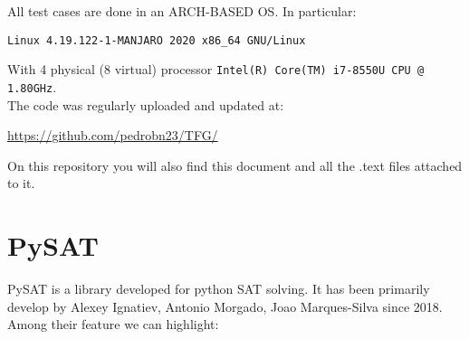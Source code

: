 All test cases are done in an ARCH-BASED OS. In particular:

  {\begin{center}
      \texttt{Linux 4.19.122-1-MANJARO  2020 x86\_64\ GNU/Linux}\\
    \end{center} }

  With 4 physical (8 virtual) processor \texttt{Intel(R) Core(TM) i7-8550U CPU @ 1.80GHz}. \\

  The code was regularly uploaded and updated at:
\begin{center}
  \url{https://github.com/pedrobn23/TFG/}
\end{center}

On this repository you will also find this document and all the .text files attached to it.  


\section{PySAT}
PySAT\cite{imms-sat18} is a library developed for python SAT solving. It has been primarily develop by Alexey Ignatiev, Antonio Morgado, Joao Marques-Silva since 2018. Among their feature we can highlight:

